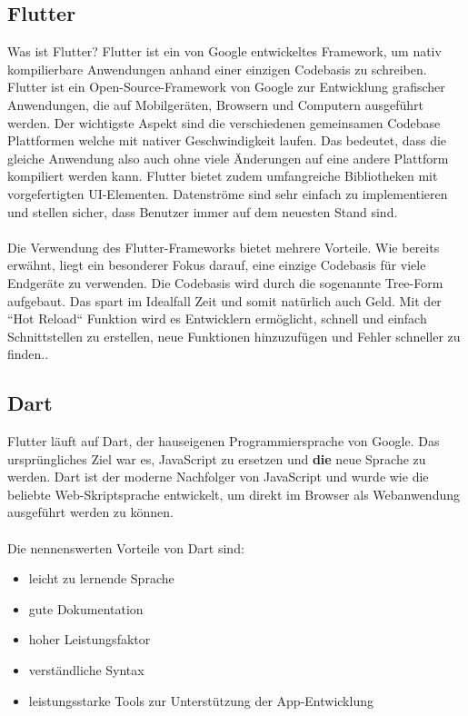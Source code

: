 \subsection{Flutter}
Was ist Flutter? Flutter ist ein von Google entwickeltes Framework, um nativ kompilierbare Anwendungen anhand einer einzigen Codebasis zu schreiben.
Flutter ist ein Open-Source-Framework von Google zur Entwicklung grafischer Anwendungen, die auf Mobilgeräten, Browsern und Computern ausgeführt werden. Der wichtigste Aspekt sind die verschiedenen gemeinsamen Codebase Plattformen welche mit nativer Geschwindigkeit laufen. Das bedeutet, dass die gleiche Anwendung also auch ohne viele Änderungen auf eine andere Plattform kompiliert werden kann. Flutter bietet zudem umfangreiche Bibliotheken mit vorgefertigten UI-Elementen. Datenströme sind sehr einfach zu implementieren und stellen sicher, dass Benutzer immer auf dem neuesten Stand sind.\\\\
Die Verwendung des Flutter-Frameworks bietet mehrere Vorteile. Wie bereits erwähnt, liegt ein besonderer Fokus darauf, eine einzige Codebasis für viele Endgeräte zu verwenden. Die Codebasis wird durch die sogenannte Tree-Form aufgebaut. Das spart im Idealfall Zeit und somit natürlich auch Geld. Mit der “Hot Reload“ Funktion wird es Entwicklern ermöglicht, schnell und einfach Schnittstellen zu erstellen, neue Funktionen hinzuzufügen und  
Fehler schneller zu finden.\cite{Flut}.

\subsection{Dart}
Flutter läuft auf Dart, der hauseigenen Programmiersprache von Google.
Das ursprüngliches Ziel war es, JavaScript zu ersetzen und \textbf{die} neue Sprache zu werden. Dart ist der moderne Nachfolger von JavaScript und wurde wie die beliebte Web-Skriptsprache entwickelt, um direkt im Browser als Webanwendung ausgeführt werden zu können.
\\
\\
Die nennenswerten Vorteile von Dart sind:
\begin{itemize}
	\item leicht zu lernende Sprache
	\item gute Dokumentation
	\item hoher Leistungsfaktor
	\item verständliche Syntax
	\item leistungsstarke Tools zur Unterstützung der App-Entwicklung
\end{itemize}
